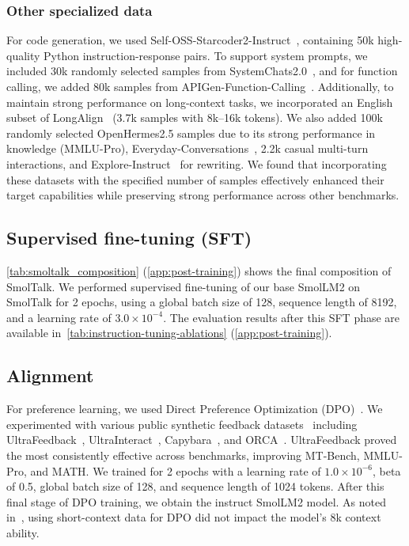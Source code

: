 \documentclass{article}
\theoremstyle{plain}
\theoremstyle{definition}
\theoremstyle{remark}
\begin{document}
\subsubsection{Other specialized data}
\vspace{-0.15cm} 
For code generation, we used Self-OSS-Starcoder2-Instruct~\cite{wei2024selfcodealign}, containing 50k high-quality Python instruction-response pairs. To support system prompts, we included 30k randomly selected samples from SystemChats2.0~\cite{systemchat2024}, and for function calling, we added 80k samples from APIGen-Function-Calling~\cite{liu2024apigen}. Additionally, to maintain strong performance on long-context tasks, we incorporated an English subset of LongAlign~\cite{bai2024longalign} (3.7k samples with 8k–16k tokens). We also added 100k randomly selected OpenHermes2.5 samples due to its strong performance in knowledge (MMLU-Pro), Everyday-Conversations~\cite{everydayconversations2024}, 2.2k casual multi-turn interactions, and Explore-Instruct~\cite{wan2023explore} for rewriting. We found that incorporating these datasets with the specified number of samples effectively enhanced their target capabilities while preserving strong performance across other benchmarks.
\vspace{-0.1cm} 
\subsection{Supervised fine-tuning (SFT)}
\vspace{-0.1cm} 
\cref{tab:smoltalk_composition} (\cref{app:post-training}) shows the final composition of SmolTalk. We performed supervised fine-tuning of our base SmolLM2 on SmolTalk for 2 epochs, using a global batch size of 128, sequence length of 8192, and a learning rate of $3.0 \times 10^{-4}$. The evaluation results after this SFT phase are available in~\cref{tab:instruction-tuning-ablations} (\cref{app:post-training}).

\vspace{-0.1cm} 
\subsection{Alignment}
\vspace{-0.1cm} 

For preference learning, we used Direct Preference Optimization (DPO)~\cite{rafailov2024direct}. We experimented with various public synthetic feedback datasets~\cite{ivison2024unpacking} including UltraFeedback~\cite{cui2024ultrafeedback}, UltraInteract~\cite{yuan2024advancing}, Capybara~\cite{daniele2023amplify-instruct}, and ORCA~\cite{lv2023orca}.
UltraFeedback proved the most consistently effective across benchmarks, improving MT-Bench, MMLU-Pro, and MATH. We trained for 2 epochs with a learning rate of $1.0 \times 10^{-6}$, beta of 0.5, global batch size of 128, and sequence length of 1024 tokens. After this final stage of DPO training, we obtain the instruct SmolLM2 model. As noted in~\citet{dubey2024llama}, using short-context data for DPO did not impact the model’s 8k context ability.
\end{document}
